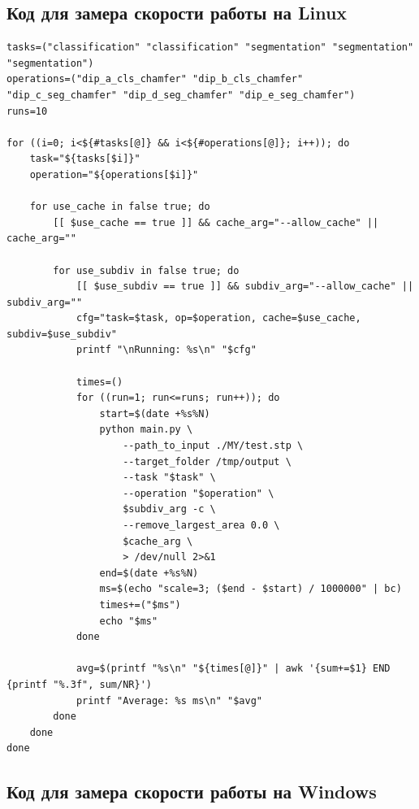 \subsection{Код для замера скорости работы на Linux}

\begin{lstlisting}
tasks=("classification" "classification" "segmentation" "segmentation" "segmentation")
operations=("dip_a_cls_chamfer" "dip_b_cls_chamfer" "dip_c_seg_chamfer" "dip_d_seg_chamfer" "dip_e_seg_chamfer")
runs=10

for ((i=0; i<${#tasks[@]} && i<${#operations[@]}; i++)); do
    task="${tasks[$i]}"
    operation="${operations[$i]}"

    for use_cache in false true; do
        [[ $use_cache == true ]] && cache_arg="--allow_cache" || cache_arg=""

        for use_subdiv in false true; do
            [[ $use_subdiv == true ]] && subdiv_arg="--allow_cache" || subdiv_arg=""
            cfg="task=$task, op=$operation, cache=$use_cache, subdiv=$use_subdiv"
            printf "\nRunning: %s\n" "$cfg"

            times=()
            for ((run=1; run<=runs; run++)); do
                start=$(date +%s%N)
                python main.py \
                    --path_to_input ./MY/test.stp \
                    --target_folder /tmp/output \
                    --task "$task" \
                    --operation "$operation" \
                    $subdiv_arg -c \
                    --remove_largest_area 0.0 \
                    $cache_arg \
                    > /dev/null 2>&1
                end=$(date +%s%N)
                ms=$(echo "scale=3; ($end - $start) / 1000000" | bc)
                times+=("$ms")
                echo "$ms"
            done

            avg=$(printf "%s\n" "${times[@]}" | awk '{sum+=$1} END {printf "%.3f", sum/NR}')
            printf "Average: %s ms\n" "$avg"
        done
    done
done
\end{lstlisting}

\subsection{Код для замера скорости работы на Windows}

